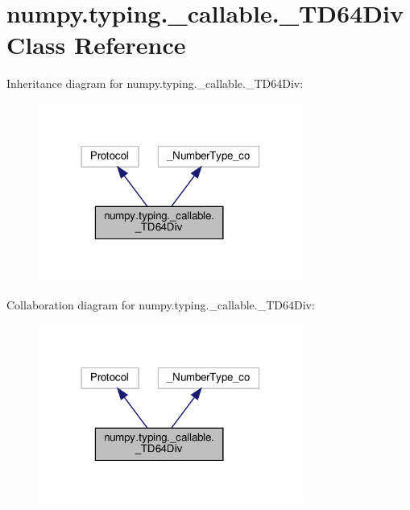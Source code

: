 \hypertarget{classnumpy_1_1typing_1_1__callable_1_1__TD64Div}{}\section{numpy.\+typing.\+\_\+callable.\+\_\+\+T\+D64\+Div Class Reference}
\label{classnumpy_1_1typing_1_1__callable_1_1__TD64Div}


Inheritance diagram for numpy.\+typing.\+\_\+callable.\+\_\+\+T\+D64\+Div\+:
\nopagebreak
\begin{figure}[H]
\begin{center}
\leavevmode
\includegraphics[width=246pt]{classnumpy_1_1typing_1_1__callable_1_1__TD64Div__inherit__graph}
\end{center}
\end{figure}


Collaboration diagram for numpy.\+typing.\+\_\+callable.\+\_\+\+T\+D64\+Div\+:
\nopagebreak
\begin{figure}[H]
\begin{center}
\leavevmode
\includegraphics[width=246pt]{classnumpy_1_1typing_1_1__callable_1_1__TD64Div__coll__graph}
\end{center}
\end{figure}
